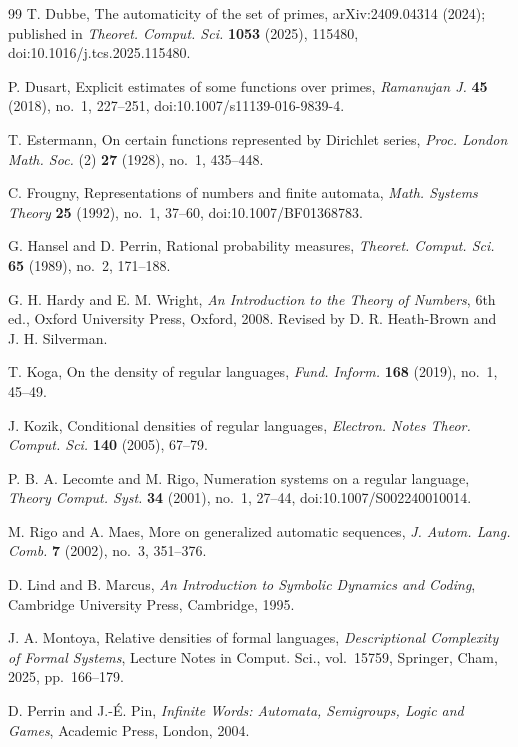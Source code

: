 \begin{thebibliography}{99}
T. Dubbe,
The automaticity of the set of primes,
arXiv:2409.04314 (2024); published in
\textit{Theoret. Comput. Sci.} \textbf{1053} (2025), 115480,
doi:10.1016/j.tcs.2025.115480.

P. Dusart,
Explicit estimates of some functions over primes,
\textit{Ramanujan J.} \textbf{45} (2018), no.~1, 227--251,
doi:10.1007/s11139-016-9839-4.

T. Estermann,
On certain functions represented by Dirichlet series,
\textit{Proc. London Math. Soc.} (2) \textbf{27} (1928), no.~1, 435--448.

C. Frougny,
Representations of numbers and finite automata,
\textit{Math. Systems Theory} \textbf{25} (1992), no.~1, 37--60,
doi:10.1007/BF01368783.

G. Hansel and D. Perrin,
Rational probability measures,
\textit{Theoret. Comput. Sci.} \textbf{65} (1989), no.~2, 171--188.

G. H. Hardy and E. M. Wright,
\textit{An Introduction to the Theory of Numbers},
6th ed., Oxford University Press, Oxford, 2008.
Revised by D. R. Heath-Brown and J. H. Silverman.

T. Koga,
On the density of regular languages,
\textit{Fund. Inform.} \textbf{168} (2019), no.~1, 45--49.

J. Kozik,
Conditional densities of regular languages,
\textit{Electron. Notes Theor. Comput. Sci.} \textbf{140} (2005), 67--79.

P. B. A. Lecomte and M. Rigo,
Numeration systems on a regular language,
\textit{Theory Comput. Syst.} \textbf{34} (2001), no.~1, 27--44,
doi:10.1007/S002240010014.

M. Rigo and A. Maes,
More on generalized automatic sequences,
\textit{J. Autom. Lang. Comb.} \textbf{7} (2002), no.~3, 351--376.

D. Lind and B. Marcus,
\textit{An Introduction to Symbolic Dynamics and Coding},
Cambridge University Press, Cambridge, 1995.

J. A. Montoya,
Relative densities of formal languages,
\textit{Descriptional Complexity of Formal Systems},
Lecture Notes in Comput. Sci., vol.~15759, Springer, Cham, 2025,
pp.~166--179.

D. Perrin and J.-\'E. Pin,
\textit{Infinite Words: Automata, Semigroups, Logic and Games},
Academic Press, London, 2004.


\end{thebibliography}
